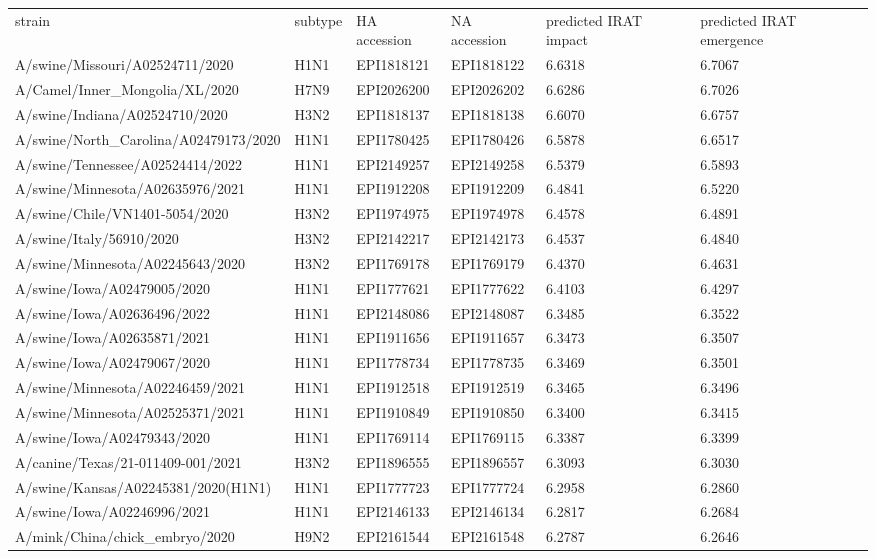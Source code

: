 \begin{tabular}{L{1.95in}|L{.25in}|L{.60in}|L{.6in}|C{1in}|C{1in}}\hline
strain&subtype& HA  accession & NA  accession & predicted  IRAT  impact & predicted  IRAT  emergence \\
 A/swine/Missouri/A02524711/2020 &H1N1&EPI1818121&EPI1818122&6.6318&6.7067\\
 A/Camel/Inner\_Mongolia/XL/2020 &H7N9&EPI2026200&EPI2026202&6.6286&6.7026\\
 A/swine/Indiana/A02524710/2020 &H3N2&EPI1818137&EPI1818138&6.6070&6.6757\\
 A/swine/North\_Carolina/A02479173/2020 &H1N1&EPI1780425&EPI1780426&6.5878&6.6517\\
 A/swine/Tennessee/A02524414/2022 &H1N1&EPI2149257&EPI2149258&6.5379&6.5893\\
 A/swine/Minnesota/A02635976/2021 &H1N1&EPI1912208&EPI1912209&6.4841&6.5220\\
 A/swine/Chile/VN1401-5054/2020 &H3N2&EPI1974975&EPI1974978&6.4578&6.4891\\
 A/swine/Italy/56910/2020 &H3N2&EPI2142217&EPI2142173&6.4537&6.4840\\
 A/swine/Minnesota/A02245643/2020 &H3N2&EPI1769178&EPI1769179&6.4370&6.4631\\
 A/swine/Iowa/A02479005/2020 &H1N1&EPI1777621&EPI1777622&6.4103&6.4297\\
 A/swine/Iowa/A02636496/2022 &H1N1&EPI2148086&EPI2148087&6.3485&6.3522\\
 A/swine/Iowa/A02635871/2021 &H1N1&EPI1911656&EPI1911657&6.3473&6.3507\\
 A/swine/Iowa/A02479067/2020 &H1N1&EPI1778734&EPI1778735&6.3469&6.3501\\
 A/swine/Minnesota/A02246459/2021 &H1N1&EPI1912518&EPI1912519&6.3465&6.3496\\
 A/swine/Minnesota/A02525371/2021 &H1N1&EPI1910849&EPI1910850&6.3400&6.3415\\
 A/swine/Iowa/A02479343/2020 &H1N1&EPI1769114&EPI1769115&6.3387&6.3399\\
 A/canine/Texas/21-011409-001/2021 &H3N2&EPI1896555&EPI1896557&6.3093&6.3030\\
 A/swine/Kansas/A02245381/2020(H1N1) &H1N1&EPI1777723&EPI1777724&6.2958&6.2860\\
 A/swine/Iowa/A02246996/2021 &H1N1&EPI2146133&EPI2146134&6.2817&6.2684\\
 A/mink/China/chick\_embryo/2020 &H9N2&EPI2161544&EPI2161548&6.2787&6.2646\\
\hline\end{tabular}
